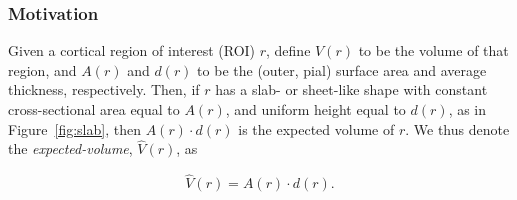 \documentclass{article}
\newcommand{\note}[2][cyan]{\textbf{NOTE}: \textcolor{#1}{#2}}
\begin{document}


\subsubsection{Motivation}

Given a cortical region of interest (ROI) \(r\), define \(V(r)\) to be the
volume of that region, and \(A(r)\) and \(d(r)\) to be the (outer, pial)
surface area and average thickness, respectively. Then, if \(r\) has a
slab- or sheet-like shape with constant cross-sectional area equal to
\(A(r)\), and uniform height equal to \(d(r)\), as in Figure~\ref{fig:slab}, then
\(A(r) \cdot d(r)\) is the expected volume of \(r\). We thus denote the
\emph{expected-volume}, \(\hat{V}(r)\), as

\begin{equation}
\hat{V}(r) = A(r) \cdot d(r).
\end{equation}
\end{document}
